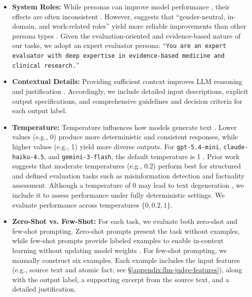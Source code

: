\documentclass{article}
\begin{document}
\begin{itemize}
[noitemsep,topsep=0pt,leftmargin=0.6cm]
    \item \textbf{System Roles:} While personas can improve model performance \cite{openai_prompt_engineering_guide}, their effects are often inconsistent \cite{zheng-etal-2024-helpful}.  However, \citet{zheng-etal-2024-helpful} suggests that ``gender-neutral, in-domain, and work-related roles'' yield more reliable improvements than other persona types \cite{zheng-etal-2024-helpful}. Given the evaluation-oriented and evidence-based nature of our tasks, we adopt an expert evaluator persona: ``\texttt{You are an expert evaluator with deep expertise in evidence-based medicine and clinical research.}''
    \item \textbf{Contextual Details:} Providing sufficient context improves LLM reasoning and justification \cite{anthropic_prompt_engineering_overview, google_prompt_engineering_overview, openai_prompt_engineering_guide}. Accordingly, we include detailed input descriptions, explicit output specifications, and comprehensive guidelines and decision criteria for each output label.
    \item\textbf{Temperature: }Temperature influences how models generate text \cite{openai_prompt_engineering_guide}.  Lower values (e.g., 0) produce more deterministic and consistent responses, while higher values (e.g., 1) yield more diverse outputs. For \texttt{gpt-5.4-mini}, \texttt{claude-haiku-4.5}, and \texttt{gemini-3-flash}, the default temperature is 1 \cite{anthropic_messages_api_create, google_gemini_3_flash_vertex_ai, openai_latest_gpt5_4_guide}. Prior work \cite{githubtoxicity2022, dammu-etal-2024-uncultured, park-etal-2024-valuescope, Jung_Juneja_Mitra_2025} suggests that moderate temperatures (e.g., 0.2) perform best for structured and defined evaluation tasks such as misinformation detection and factuality assessment. Although a temperature of 0 may lead to text degeneration \cite{holtzman2019curious}, we include it to assess performance under fully deterministic settings. We evaluate performance across temperatures $\{0, 0.2, 1\}$.
    \item \textbf{Zero-Shot vs. Few-Shot:} For each task, we evaluate both zero-shot and few-shot prompting. Zero-shot prompts present the task without examples, while few-shot prompts provide labeled examples to enable in-context learning without updating model weights \cite{NEURIPS2020_1457c0d6}. For few-shot prompting, we manually construct six examples. Each example includes the input features (e.g., source text and atomic fact; see \S\ref{appendix:llm-judge-features}), along with the output label, a supporting excerpt from the source text, and a detailed justification.

\end{itemize}
\end{document}
